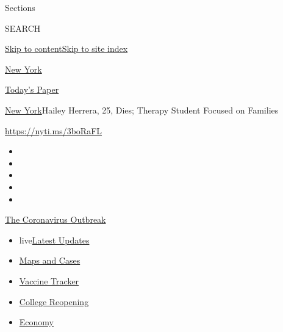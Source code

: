 Sections

SEARCH

\protect\hyperlink{site-content}{Skip to
content}\protect\hyperlink{site-index}{Skip to site index}

\href{https://www.nytimes.com/section/nyregion}{New York}

\href{https://myaccount.nytimes.com/auth/login?response_type=cookie\&client_id=vi}{}

\href{https://www.nytimes.com/section/todayspaper}{Today's Paper}

\href{/section/nyregion}{New York}\textbar{}Hailey Herrera, 25, Dies;
Therapy Student Focused on Families

\url{https://nyti.ms/3boRaFL}

\begin{itemize}
\item
\item
\item
\item
\item
\end{itemize}

\href{https://www.nytimes.com/news-event/coronavirus?action=click\&pgtype=Article\&state=default\&region=TOP_BANNER\&context=storylines_menu}{The
Coronavirus Outbreak}

\begin{itemize}
\tightlist
\item
  live\href{https://www.nytimes.com/2020/08/03/world/coronavirus-covid-19.html?action=click\&pgtype=Article\&state=default\&region=TOP_BANNER\&context=storylines_menu}{Latest
  Updates}
\item
  \href{https://www.nytimes.com/interactive/2020/us/coronavirus-us-cases.html?action=click\&pgtype=Article\&state=default\&region=TOP_BANNER\&context=storylines_menu}{Maps
  and Cases}
\item
  \href{https://www.nytimes.com/interactive/2020/science/coronavirus-vaccine-tracker.html?action=click\&pgtype=Article\&state=default\&region=TOP_BANNER\&context=storylines_menu}{Vaccine
  Tracker}
\item
  \href{https://www.nytimes.com/2020/08/02/us/covid-college-reopening.html?action=click\&pgtype=Article\&state=default\&region=TOP_BANNER\&context=storylines_menu}{College
  Reopening}
\item
  \href{https://www.nytimes.com/live/2020/08/03/business/stock-market-today-coronavirus?action=click\&pgtype=Article\&state=default\&region=TOP_BANNER\&context=storylines_menu}{Economy}
\end{itemize}

